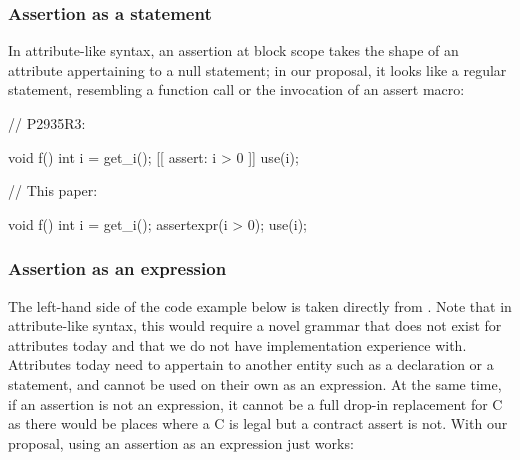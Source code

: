 \subsubsection{Assertion as a statement}

In attribute-like syntax, an assertion at block scope takes the shape of an attribute appertaining to a null statement; in our proposal, it looks like a regular statement, resembling a function call or the invocation of an assert macro:
\vspace{5mm}

\begin{minipage}{8cm}
\begin{codeblock}
// P2935R3:

void f() {
  int i = get_i();
  [[ assert: i > 0 ]]
  use(i);
}
\end{codeblock}
\end{minipage}
\begin{minipage}{8cm}
\begin{codeblock}
// This paper:

void f() {
  int i = get_i();
  assertexpr(i > 0);
  use(i);
}
\end{codeblock}
\end{minipage}




\subsubsection{Assertion as an expression}

The left-hand side of the code example below is taken directly from \cite{P2935R3}. Note that in attribute-like syntax, this would require a novel grammar that does not exist for attributes today and that we do not have implementation experience with. Attributes today need to appertain to another entity such as a declaration or a statement, and cannot be used on their own as an expression. At the same time, if an assertion is not an expression, it cannot be a full drop-in replacement for C  as there would be places where a C  is legal but a contract assert is not. With our proposal, using an assertion as an expression just works:
\vspace{5mm}

